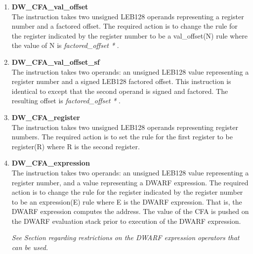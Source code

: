 \begin{enumerate}[1. ]
\item \textbf{DW\-\_CFA\-\_val\-\_offset} \\
The  
instruction takes two unsigned
LEB128 operands representing a register number and a
factored offset. The required action is to change the rule
for the register indicated by the register number to be a
val\_offset(N) rule where the value of N is 
\textit{factored\_offset * }.

\item \textbf{DW\-\_CFA\-\_val\-\_offset\-\_sf} \\
The  instruction takes two operands: an
unsigned LEB128 value representing a register number and a
signed LEB128 factored offset. This instruction is identical
to  except that the second operand is signed
and factored. The resulting offset is 
\textit{factored\_offset * }.

\item \textbf{DW\-\_CFA\-\_register} \\
The  
instruction takes two unsigned LEB128
operands representing register numbers. The required action
is to set the rule for the first register to be register(R)
where R is the second register.

\item \textbf{DW\-\_CFA\-\_expression} \\
The  
instruction takes two operands: an
unsigned LEB128 
value representing a register number, and
a  
value representing a DWARF expression. 
The
required action is to change the rule for the register
indicated by the register number to be an expression(E)
rule where E is the DWARF expression. That is, the DWARF
expression computes the address. The value of the CFA is
pushed on the DWARF evaluation stack prior to execution of
the DWARF expression.

\textit{See Section  
regarding restrictions on the DWARF
expression operators that can be used.}


\end{enumerate}
